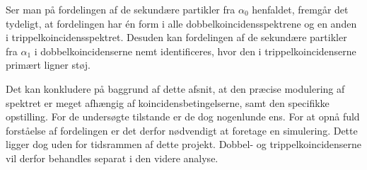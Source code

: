Ser man på fordelingen af de sekundære partikler fra $\alpha_{0}$ henfaldet, fremgår det tydeligt, at
fordelingen har én form i alle dobbelkoincidensspektrene og en anden i
trippelkoincidensspektret. Desuden kan fordelingen af de sekundære partikler fra $\alpha_{1}$ i
dobbelkoincidenserne nemt identificeres, hvor den i trippelkoincidenserne primært ligner støj.

Det kan konkludere på baggrund af dette afsnit, at den præcise modulering af spektret er meget
afhængig af koincidensbetingelserne, samt den specifikke opstilling. For de undersøgte tilstande er
de dog nogenlunde ens. For at opnå fuld forståelse af fordelingen er det
derfor nødvendigt at foretage en simulering. Dette ligger dog uden for tidsrammen af dette
projekt. Dobbel- og trippelkoincidenserne vil derfor behandles separat i den videre analyse.
